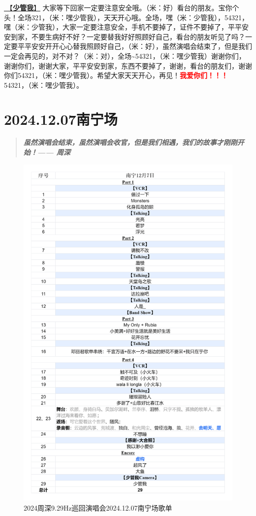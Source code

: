 \documentclass[]{ctexbook}
\begin{document}
\hyperref[watch-ur-manners]{🎵【\textbf{少管我}】} 大家等下回家一定要注意安全哦。（米：好）看台的朋友。宝你个头！全场321，（米：嘿少管我），天天开心哦。全场，嘿（米：少管我），54321，嘿（米：少管我），大家一定要注意安全，手机不要掉了，证件不要掉了，平平安安到家，不要生病好不好？一定要替我好好照顾好自己，看台的朋友听见了吗？一定要平平安安开开心心替我照顾好自己，（米：好），虽然演唱会结束了，但是我们一定会再见的，对不对？（米：对），全场\textasciitilde54321，（米：嘿少管我）谢谢你们，谢谢你们，谢谢大家，平平安安到家，东西不要掉了，谢谢，看台的朋友们，谢谢你们54321，（米：嘿少管我）。希望大家天天开心，再见！\textbf{\textcolor{red}{我爱你们！！！} }54321，（米：嘿少管我）。

\chapter{2024.12.07南宁场}\label{nanning-20241207}

\begin{quote}
\textbf{\emph{虽然演唱会结束，虽然演唱会收官，但是我们相遇，我们的故事才刚刚开始！------ 周深}}
\end{quote}

\begin{figure}

{\centering \includegraphics[width=320pt]{img/playlists/playlists-nanning-20241207} 

}

\caption{2024周深9.29Hz巡回演唱会2024.12.07南宁场歌单}\label{fig:unnamed-chunk-136}
\end{figure}
\end{document}
